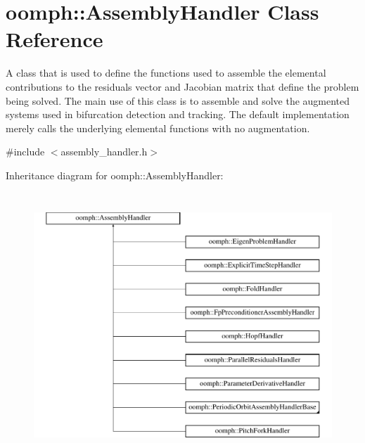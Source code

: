 \hypertarget{classoomph_1_1AssemblyHandler}{}\section{oomph\+:\+:Assembly\+Handler Class Reference}
\label{classoomph_1_1AssemblyHandler}


A class that is used to define the functions used to assemble the elemental contributions to the residuals vector and Jacobian matrix that define the problem being solved. The main use of this class is to assemble and solve the augmented systems used in bifurcation detection and tracking. The default implementation merely calls the underlying elemental functions with no augmentation.  




{\ttfamily \#include $<$assembly\+\_\+handler.\+h$>$}

Inheritance diagram for oomph\+:\+:Assembly\+Handler\+:\begin{figure}[H]
\begin{center}
\leavevmode
\includegraphics[height=10.000000cm]{classoomph_1_1AssemblyHandler}
\end{center}
\end{figure}
